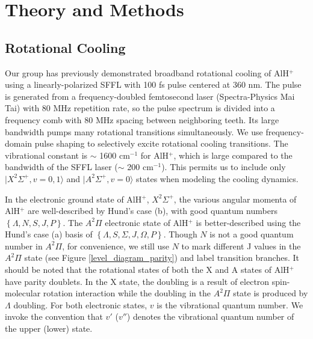 \documentclass[nofootinbib,aip,jcp,reprint]{revtex4-1}
\begin{document}

\section{Theory and Methods}
\subsection{Rotational Cooling}

Our group has previously demonstrated broadband rotational cooling of AlH$^+$ using a linearly-polarized SFFL with 100 fs pulse centered at 360 nm. The pulse is generated from a frequency-doubled femtosecond laser (Spectra-Physics Mai Tai) with 80 MHz repetition rate, so the pulse spectrum is divided into a frequency comb with 80 MHz spacing between neighboring teeth. Its large bandwidth pumps many rotational transitions simultaneously. We use frequency-domain pulse shaping to selectively excite rotational cooling transitions. The vibrational constant is $\sim$ 1600 cm$^{-1}$ for AlH$^{+}$, which is large compared to the bandwidth of the SFFL laser ($\sim$ 200 cm$^{-1}$). This permits us to include only $\lvert X^2\Sigma^+, v = 0,1 \rangle$ and $\lvert A^2\Sigma^+, v = 0 \rangle$ states when modeling the cooling dynamics.\par 

In the electronic ground state of AlH$^+$, $X^2\Sigma^+$, the various angular momenta of AlH$^+$ are well-described by Hund's case (b), with good quantum numbers  $\left\lbrace\right.\! \Lambda, N, S, J, P \!\left.\right\rbrace$.  The $A^2\Pi$ electronic state of AlH$^+$ is better-described using the Hund's case (a) basis of $\left\lbrace\right.\! \Lambda, S, \Sigma, J, \Omega, \mathit{P} \!\left.\right\rbrace$. Though $N$ is not a good quantum number in $A^2\Pi$, for convenience, we still use $N$ to mark different J values in the $A^2\Pi$ state (see Figure \ref{level_diagram_parity}) and label transition branches. It should be noted that the rotational states of both the X and A states of AlH$^+$ have parity doublets. In the X state, the doubling is a result of electron spin-molecular rotation interaction while the doubling in the $A^2\Pi$ state is produced by $\Lambda$ doubling. For both electronic states, $v$ is the vibrational quantum number. We invoke the convention that $v'$ ($v''$) denotes the vibrational quantum number of the upper (lower) state.
\end{document}
